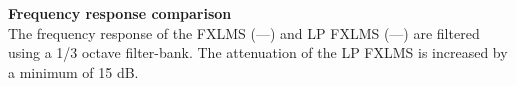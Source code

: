 \begin{minipage}{.43\columnwidth}
\textbf{Frequency response comparison}\\
The frequency response of the FXLMS (\textcolor{MATLABblue}{---}) and LP FXLMS (\textcolor{MATLABred}{---}) are filtered using a 1/3 octave filter-bank.
The attenuation of the LP FXLMS is increased by a minimum of 15 dB.


\end{minipage}%
\hspace{4mm}
\begin{minipage}{0.5\columnwidth}
	
\end{minipage}
